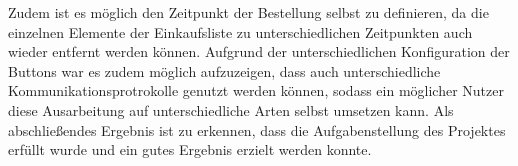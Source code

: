 Zudem ist es möglich den Zeitpunkt der Bestellung selbst zu definieren, da die einzelnen Elemente der Einkaufsliste zu unterschiedlichen Zeitpunkten auch wieder entfernt werden können. 
Aufgrund der unterschiedlichen Konfiguration der Buttons war es zudem möglich aufzuzeigen, dass auch unterschiedliche Kommunikationsprotrokolle genutzt werden können, sodass ein möglicher Nutzer diese Ausarbeitung auf unterschiedliche Arten selbst umsetzen kann. Als abschließendes Ergebnis ist zu erkennen, dass die Aufgabenstellung des Projektes erfüllt wurde und ein gutes Ergebnis erzielt werden konnte. 
